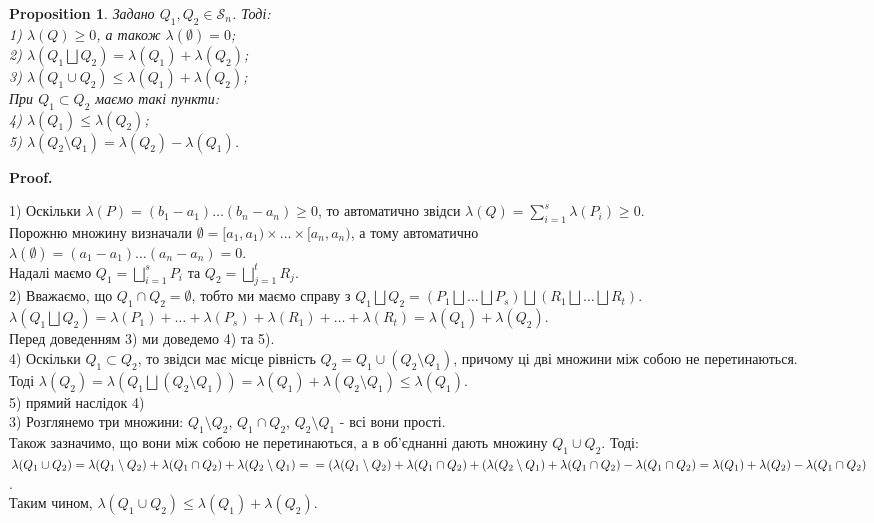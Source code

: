 \documentclass[a4paper, 10pt]{article}
\makeatletter
\def\huge{\displaystyle}
\def\qed{$\blacksquare$}
\theoremstyle{theoremdd}
\theoremstyle{theoremdd}
\theoremstyle{theoremdd}
\theoremstyle{theoremdd}
\theoremstyle{theoremdd}
\newtheorem{proposition}[theorem]{Proposition}
\theoremstyle{theoremdd}
\theoremstyle{theoremdd}
\theoremstyle{theoremdd}
\renewenvironment{proof}[1][Proof.\\]{\par
\pushQED{\hfill \qed}%
\normalfont \topsep6\p@\@plus6\p@\relax
\trivlist
\item\relax
{\bfseries
#1\@addpunct{.}}\hspace\labelsep\ignorespaces
}{%
\popQED\endtrivlist\@endpefalse
}
\makeatother
\begin{document}
\begin{proposition}
Задано $Q_1,Q_2 \in \mathcal{S}_n$. Тоді:\\
1) $\lambda(Q) \geq 0$, а також $\lambda(\emptyset) = 0$;\\
2) $\lambda(Q_1 \bigsqcup Q_2) = \lambda(Q_1) + \lambda(Q_2)$;\\
3) $\lambda (Q_1 \cup Q_2) \leq \lambda(Q_1) + \lambda(Q_2)$;\\
При $Q_1 \subset Q_2$ маємо такі пункти:\\
4) $\lambda(Q_1) \leq \lambda(Q_2)$;\\
5) $\lambda(Q_2 \setminus Q_1) = \lambda(Q_2) - \lambda(Q_1)$.
\end{proposition}

\begin{proof}
1) Оскільки $\lambda(P) = (b_1-a_1)\dots (b_n-a_n) \geq 0$, то автоматично звідси $\lambda(Q) = \huge\sum_{i=1}^s \lambda(P_i) \geq 0$.\\
Порожню множину визначали $\emptyset = [a_1,a_1) \times \dots \times [a_n,a_n)$, а тому автоматично \\ $\lambda (\emptyset) = (a_1-a_1) \dots (a_n-a_n) = 0$.
\bigskip \\
Надалі маємо $Q_1 = \huge\bigsqcup_{i=1}^s P_i$ та $Q_2 = \huge\bigsqcup_{j=1}^t R_j$.\\
2) Вважаємо, що $Q_1 \cap Q_2 = \emptyset$, тобто ми маємо справу з $Q_1 \bigsqcup Q_2 = (P_1 \bigsqcup \dots \bigsqcup P_s) \bigsqcup (R_1 \bigsqcup \dots \bigsqcup R_t)$.\\
$\lambda (Q_1 \bigsqcup Q_2) = \lambda(P_1) + \dots + \lambda(P_s) + \lambda(R_1) + \dots + \lambda(R_t) = \lambda(Q_1) + \lambda(Q_2)$.
\bigskip \\
Перед доведенням 3) ми доведемо 4) та 5).
\bigskip \\
4) Оскільки $Q_1 \subset Q_2$, то звідси має місце рівність $Q_2 = Q_1 \cup (Q_2 \setminus Q_1)$, причому ці дві множини між собою не перетинаються.\\
Тоді $\lambda(Q_2) = \lambda(Q_1 \bigsqcup (Q_2 \setminus Q_1)) = \lambda(Q_1) + \lambda(Q_2 \setminus Q_1) \leq \lambda(Q_1)$.
\bigskip \\
5) прямий наслідок 4)
\bigskip \\
3) Розглянемо три множини: $Q_1 \setminus Q_2$, $Q_1 \cap Q_2$, $Q_2 \setminus Q_1$ - всі вони прості.\\
Також зазначимо, що вони між собою не перетинаються, а в об'єднанні дають множину $Q_1 \cup Q_2$. Тоді:\\
$\lambda(Q_1 \cup Q_2) = \lambda(Q_1 \setminus Q_2) + \lambda (Q_1 \cap Q_2) + \lambda(Q_2 \setminus Q_1) = \\ = (\lambda(Q_1 \setminus Q_2) + \lambda(Q_1\cap Q_2) + (\lambda(Q_2 \setminus Q_1) + \lambda(Q_1 \cap Q_2) - \lambda(Q_1 \cap Q_2) = \lambda(Q_1) + \lambda(Q_2) - \lambda(Q_1 \cap Q_2)$.\\
Таким чином, $\lambda(Q_1 \cup Q_2) \leq \lambda(Q_1) + \lambda(Q_2)$.
\end{proof}
\end{document}

